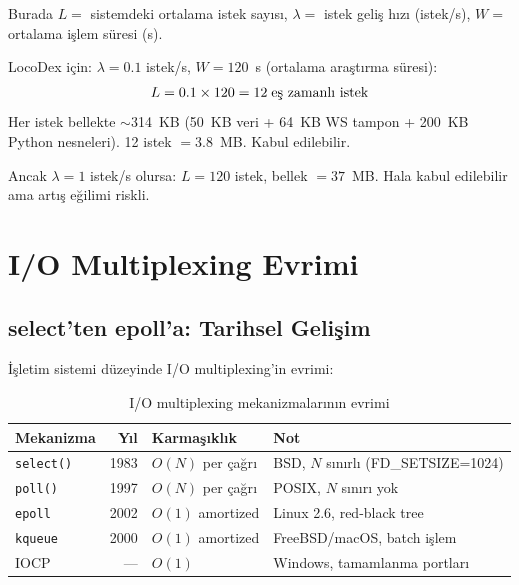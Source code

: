 Burada $L =$ sistemdeki ortalama istek say{\i}s{\i}, $\lambda =$ istek geli\c{s} h{\i}z{\i} (istek/s), $W =$ ortalama i\c{s}lem s\"{u}resi (s).

\begin{ornek}
LocoDex i\c{c}in: $\lambda = 0.1$ istek/s, $W = 120$~s (ortalama ara\c{s}t{\i}rma s\"{u}resi):
\[
L = 0.1 \times 120 = 12 \;\text{e\c{s} zamanl{\i} istek}
\]
Her istek bellekte $\sim$314~KB (50~KB veri + 64~KB WS tampon + 200~KB Python nesneleri). 12 istek $= 3.8$~MB. Kabul edilebilir.

Ancak $\lambda = 1$ istek/s olursa: $L = 120$ istek, bellek $= 37$~MB. Hala kabul edilebilir ama art{\i}\c{s} e\u{g}ilimi riskli.
\end{ornek}



\section{I/O Multiplexing Evrimi}
\label{sec:io-multiplexing}

\subsection{select'ten epoll'a: Tarihsel Geli\c{s}im}
\label{sec:select-epoll}

\.{I}\c{s}letim sistemi d\"{u}zeyinde I/O multiplexing'in evrimi:

\begin{table}[H]
\centering
\caption{I/O multiplexing mekanizmalar{\i}n{\i}n evrimi}
\label{tab:io-multiplexing}
\begin{tabularx}{\textwidth}{lrlX}
\toprule
\color{chapterBlue}\textbf{Mekanizma} & \color{chapterBlue}\textbf{Y{\i}l} & \color{chapterBlue}\textbf{Karma\c{s}{\i}kl{\i}k} & \color{chapterBlue}\textbf{Not} \\
\midrule
\texttt{select()} & 1983 & $O(N)$ per \c{c}a\u{g}r{\i}  & BSD, $N$ s{\i}n{\i}rl{\i} (FD\_SETSIZE=1024) \\
\texttt{poll()}   & 1997 & $O(N)$ per \c{c}a\u{g}r{\i}  & POSIX, $N$ s{\i}n{\i}r{\i} yok \\
\texttt{epoll}    & 2002 & $O(1)$ amortized     & Linux 2.6, red-black tree \\
\texttt{kqueue}   & 2000 & $O(1)$ amortized     & FreeBSD/macOS, batch i\c{s}lem \\
IOCP              & ---  & $O(1)$               & Windows, tamamlanma portlar{\i} \\
\bottomrule
\end{tabularx}
\end{table}

